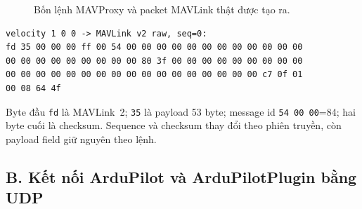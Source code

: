 \documentclass[a4paper]{article}
\begin{document}
\begin{figure}[H]
\caption{Bốn lệnh MAVProxy và packet MAVLink thật được tạo ra.}
\label{fig:mavproxy-packets}
\end{figure}

\begin{lstlisting}
velocity 1 0 0 -> MAVLink v2 raw, seq=0:
fd 35 00 00 00 ff 00 54 00 00 00 00 00 00 00 00 00 00 00 00
00 00 00 00 00 00 00 00 00 80 3f 00 00 00 00 00 00 00 00 00
00 00 00 00 00 00 00 00 00 00 00 00 00 00 00 00 00 c7 0f 01
00 08 64 4f
\end{lstlisting}

Byte đầu \texttt{fd} là MAVLink~2; \texttt{35} là payload 53 byte; message id \texttt{54 00 00}=84; hai byte cuối là checksum. Sequence và checksum thay đổi theo phiên truyền, còn payload field giữ nguyên theo lệnh.

\subsection{B. Kết nối ArduPilot và ArduPilotPlugin bằng UDP}
\end{document}
